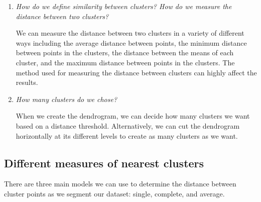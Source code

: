 \documentclass{article}
\begin{document}
\begin{enumerate}
	\item \textit{How do we define similarity between clusters? How do we measure the distance between two clusters?}
	
	We can measure the distance between two clusters in a variety of different ways including the average distance between points, the minimum distance between points in the clusters, the distance between the means of each cluster, and the maximum distance between points in the clusters. The method used for measuring the distance between clusters can highly affect the results.
	
	\item \textit{How many clusters do we chose?}
	
	When we create the dendrogram, we can decide how many clusters we want based on a distance threshold. Alternatively, we can cut the dendrogram horizontally at its different levels to create as many clusters as we want.
	
\end{enumerate}

\subsection{Different measures of nearest clusters}
There are three main models we can use to determine the distance between cluster points as we segment our dataset: single, complete, and average.
\end{document}
